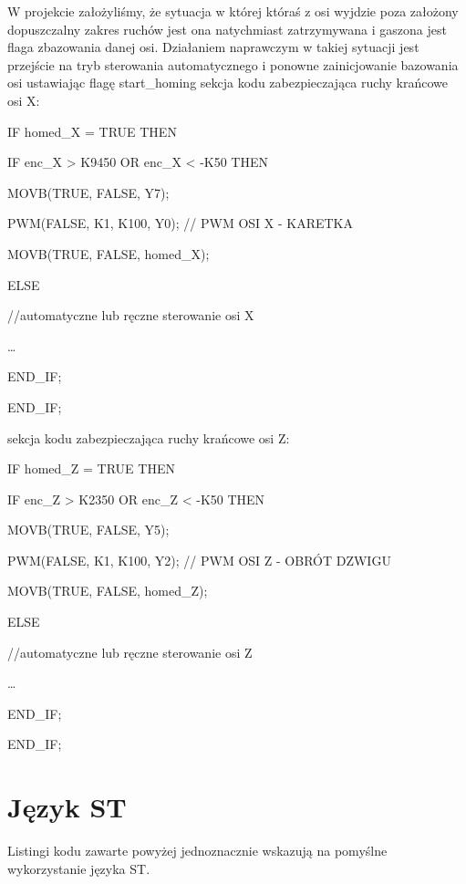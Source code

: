\documentclass{mwrep}
\begin{document}
W projekcie założyliśmy, że sytuacja w której któraś z osi wyjdzie poza założony dopuszczalny zakres ruchów jest ona natychmiast zatrzymywana i gaszona jest flaga zbazowania danej osi. Działaniem naprawczym w takiej sytuacji jest przejście na tryb sterowania automatycznego i ponowne zainicjowanie bazowania osi ustawiając flagę start\_homing
sekcja kodu zabezpieczająca ruchy krańcowe osi X:

\quad IF homed\_X = TRUE THEN

\quad \quad IF enc\_X > K9450 OR enc\_X < -K50 THEN

\quad \quad \quad MOVB(TRUE, FALSE, Y7);

\quad \quad \quad PWM(FALSE, K1, K100, Y0); // PWM OSI X - KARETKA

\quad \quad \quad MOVB(TRUE, FALSE, homed\_X);

\quad \quad ELSE\quad \quad 

\quad \quad \quad //automatyczne lub ręczne sterowanie osi X

\quad \quad \quad …

\quad \quad END\_IF;

\quad END\_IF;



sekcja kodu zabezpieczająca ruchy krańcowe osi Z:



\quad IF homed\_Z = TRUE THEN

\quad \quad IF enc\_Z > K2350 OR enc\_Z < -K50 THEN

\quad \quad \quad MOVB(TRUE, FALSE, Y5);

\quad \quad \quad PWM(FALSE, K1, K100, Y2); // PWM OSI Z - OBRÓT DZWIGU

\quad \quad \quad MOVB(TRUE, FALSE, homed\_Z);

\quad \quad ELSE\quad 

\quad \quad \quad //automatyczne lub ręczne sterowanie osi Z

\quad \quad \quad …

\quad \quad END\_IF;

\quad END\_IF;



\section{Język ST}
\label{PLC::ST}

Listingi kodu zawarte powyżej jednoznacznie wskazują na pomyślne wykorzystanie języka ST.
\end{document}
